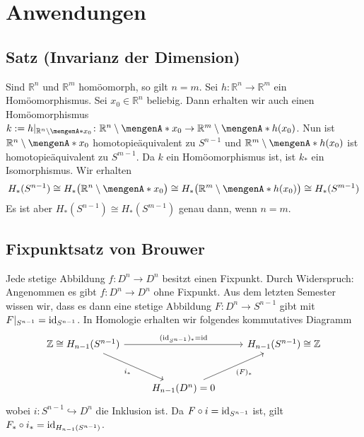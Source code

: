 \section{Anwendungen} %
\label{sec:10}

\subsection[Satz: Invarianz der Dimension]{Satz (Invarianz der Dimension)} %
\label{sub:101}
Sind $\mathds{R}^n$ und $\mathds{R}^m$ homöomorph, so gilt $n=m$.
Sei $h \colon \mathds{R}^n \to \mathds{R}^m$ ein Homöomorphismus. Sei $x_0 \in \mathds{R}^n$ beliebig. Dann erhalten wir auch einen Homöomorphismus 
$k := h|_{\mathds{R}^n\setminus \set{x_0}} \colon \mathds{R}^n \setminus \set{x_0} \to \mathds{R}^m  \setminus \set{h(x_0)}$. Nun ist $\mathds{R}^n \setminus \set{x_0}$
homotopieäquivalent zu $S^{n-1}$ und $\mathds{R}^{m}\setminus\set{h(x_0)}$ ist homotopieäquivalent zu $S^{m-1}$. Da $k$ ein Homöomorphismus ist, ist $k_*$ ein Isomorphismus.
Wir erhalten
\begin{align*}
	H_*(S^{n-1}) \cong H_* \enbrace[\big]{\mathds{R}^n \setminus \set{x_0}}  \cong H_* \enbrace[\big]{\mathds{R}^m \setminus \set{h(x_0)}} \cong H_*(S^{m-1})
\end{align*}
Es ist aber $H_*(S^{n-1}) \cong H_*(S^{m-1})$ genau dann, wenn $n=m$. \bewende

\subsection{Fixpunktsatz von Brouwer} %
\label{sub:102}
Jede stetige Abbildung $f \colon D^n \to D^n$ besitzt einen Fixpunkt.
Durch Widerspruch: Angenommen es gibt $f\colon D^n \to D^n$ ohne Fixpunkt. Aus dem letzten Semester wissen wir, dass es dann eine stetige Abbildung $F\colon D^n \to S^{n-1}$ 
gibt mit $F|_{S^{n-1}} = \operatorname{id}_{S^{n-1}}$. In Homologie erhalten wir folgendes kommutatives Diagramm 
\[
	\begin{tikzcd}[row sep=large]
		\mathds{Z}\cong H_{n-1}(S^{n-1}) \arrow[rr,"(\id_{S^{n-1}})_* = \id" ] \arrow[dr,"i_*"'] && H_{n-1}(S^{n-1}) \cong \mathds{Z} \\
		& H_{n-1}(D^n)=0  \urar["(F)_*"']&
	\end{tikzcd}
\]
wobei $i\colon S^{n-1} \hookrightarrow D^n$ die Inklusion ist. Da $F \circ i = \operatorname{id}_{S^{n-1}}$ ist, gilt $F_* \circ i_* = \operatorname{id}_{H_{n-1}(S^{n-1})}$. \light \bewende
